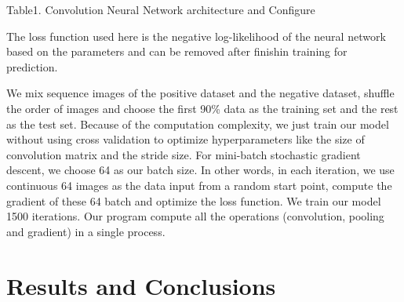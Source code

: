 \documentclass[letterpaper, 11pt]{article}
\begin{document}
\begin{multicols*}{2}
{\begin{center}
\footnotesize{Table1. Convolution Neural Network architecture and Configure}
\end{center}

The loss function used here is the negative log-likelihood of the neural network based on the parameters and can be removed after finishin training for prediction.

We mix sequence images of the positive dataset and the negative dataset, shuffle the order of images and choose the first 90\% data as the training set and the rest as the test set. Because of the computation complexity, we just train our model without using cross validation to optimize hyperparameters like the size of convolution matrix and the stride size. For mini-batch stochastic gradient descent, we choose 64 as our batch size. In other words, in each iteration, we use continuous 64 images as the data input from a random start point, compute the gradient of these 64 batch and optimize the loss function. We train our model 1500 iterations. Our program compute all the operations (convolution, pooling and gradient) in a single process.
}

\section{Results and Conclusions}

{
}
\end{multicols*}
\end{document}
